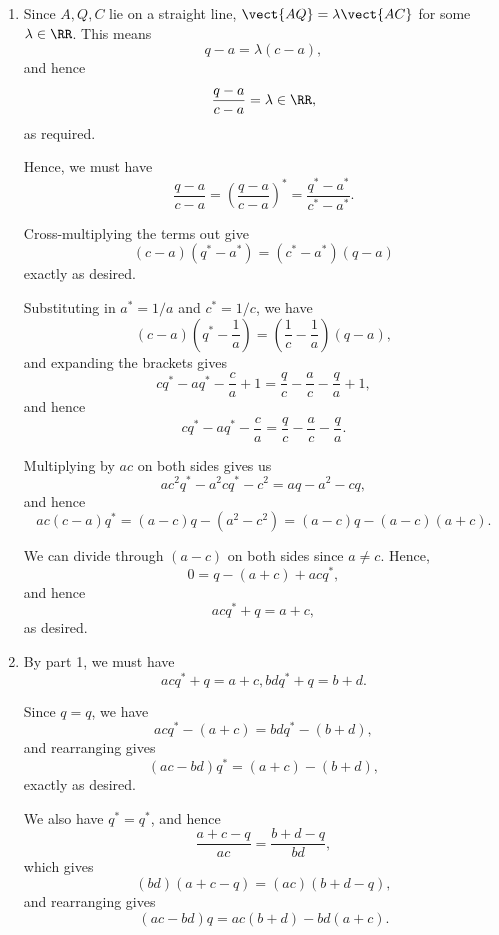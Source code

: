 \Question{\currfilebase}

\begin{enumerate}
    \item Since \(A, Q, C\) lie on a straight line, \(\vect{AQ} = \lambda \vect{AC}\) for some \(\lambda \in \RR\). This means
          \[
              q - a = \lambda (c - a),
          \]
          and hence
          \[
              \frac{q - a}{c - a} = \lambda \in \RR,
          \]
          as required.

          Hence, we must have
          \[
              \frac{q - a}{c - a} = \left(\frac{q - a}{c - a}\right)^* = \frac{q^* - a^*}{c^* - a^*}.
          \]

          Cross-multiplying the terms out give
          \[
              (c - a)(q^* - a^*) = (c^* - a^*)(q - a)
          \]
          exactly as desired.

          Substituting in \(a^* = 1 / a\) and \(c^* = 1 / c\), we have
          \[
              (c - a) \left(q^* - \frac{1}{a}\right) = \left(\frac{1}{c} - \frac{1}{a}\right)(q - a),
          \]
          and expanding the brackets gives
          \[
              cq^* - aq^* - \frac{c}{a} + 1 = \frac{q}{c} - \frac{a}{c} - \frac{q}{a} + 1,
          \]
          and hence
          \[
              cq^* - aq^* - \frac{c}{a} = \frac{q}{c} - \frac{a}{c} - \frac{q}{a}.
          \]

          Multiplying by \(ac\) on both sides gives us
          \[
              a c^2 q^* - a^2 c q^* - c^2 = aq - a^2 - cq,
          \]
          and hence
          \[
              ac (c - a) q^* = (a - c)q - (a^2 - c^2) = (a - c)q - (a - c)(a + c).
          \]

          We can divide through \((a - c)\) on both sides since \(a \neq c\). Hence,
          \[
              0 = q - (a + c) + ac q^*,
          \]
          and hence
          \[
              acq^* + q = a + c,
          \]
          as desired.

    \item By part 1, we must have
          \[
              acq^* + q = a + c, bdq^* + q = b + d.
          \]

          Since \(q = q\), we have
          \[
              acq^* - (a + c) = bdq^* - (b + d),
          \]
          and rearranging gives
          \[
              (ac - bd) q^* = (a + c) - (b + d),
          \]
          exactly as desired.

          We also have \(q^* = q^*\), and hence
          \[
              \frac{a + c - q}{ac} = \frac{b + d - q}{bd},
          \]
          which gives
          \[
              (bd)(a + c - q) = (ac)(b + d - q),
          \]
          and rearranging gives
          \[
              (ac - bd)q = ac(b + d) - bd(a + c).
          \]


\end{enumerate}

